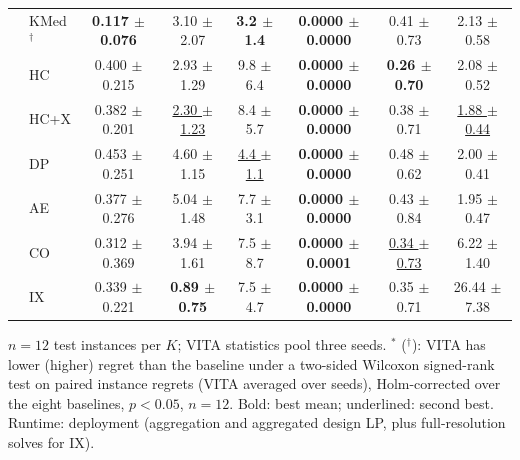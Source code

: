 \begin{table}[!t]
\begin{tabular}{@{}clcccccc@{}}
 & KMed$^{\dagger}$ & \textbf{0.117 $\pm$ 0.076} & 3.10 $\pm$ 2.07 & \textbf{3.2 $\pm$ 1.4} & \textbf{0.0000 $\pm$ 0.0000} & 0.41 $\pm$ 0.73 & 2.13 $\pm$ 0.58 \\
 & HC & 0.400 $\pm$ 0.215 & 2.93 $\pm$ 1.29 & 9.8 $\pm$ 6.4 & \textbf{0.0000 $\pm$ 0.0000} & \textbf{0.26 $\pm$ 0.70} & 2.08 $\pm$ 0.52 \\
 & HC+X & 0.382 $\pm$ 0.201 & \underline{2.30 $\pm$ 1.23} & 8.4 $\pm$ 5.7 & \textbf{0.0000 $\pm$ 0.0000} & 0.38 $\pm$ 0.71 & \underline{1.88 $\pm$ 0.44} \\
 & DP & 0.453 $\pm$ 0.251 & 4.60 $\pm$ 1.15 & \underline{4.4 $\pm$ 1.1} & \textbf{0.0000 $\pm$ 0.0000} & 0.48 $\pm$ 0.62 & 2.00 $\pm$ 0.41 \\
 & AE & 0.377 $\pm$ 0.276 & 5.04 $\pm$ 1.48 & 7.7 $\pm$ 3.1 & \textbf{0.0000 $\pm$ 0.0000} & 0.43 $\pm$ 0.84 & 1.95 $\pm$ 0.47 \\
 & CO & 0.312 $\pm$ 0.369 & 3.94 $\pm$ 1.61 & 7.5 $\pm$ 8.7 & \textbf{0.0000 $\pm$ 0.0001} & \underline{0.34 $\pm$ 0.73} & 6.22 $\pm$ 1.40 \\
 & IX & 0.339 $\pm$ 0.221 & \textbf{0.89 $\pm$ 0.75} & 7.5 $\pm$ 4.7 & \textbf{0.0000 $\pm$ 0.0000} & 0.35 $\pm$ 0.71 & 26.44 $\pm$ 7.38 \\
\bottomrule
\end{tabular}
\par\vspace{1mm}\parbox{0.97\textwidth}{\footnotesize $n=12$ test instances per $K$; VITA statistics pool three seeds. $^{\ast}$ ($^{\dagger}$): VITA has lower (higher) regret than the baseline under a two-sided Wilcoxon signed-rank test on paired instance regrets (VITA averaged over seeds), Holm-corrected over the eight baselines, $p<0.05$, $n=12$. Bold: best mean; underlined: second best. Runtime: deployment (aggregation and aggregated design LP, plus full-resolution solves for IX).}
\end{table}
